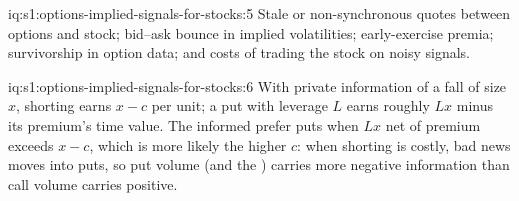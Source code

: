 \begin{solution}{iq:s1:options-implied-signals-for-stocks:5}
Stale or non-synchronous quotes between options and stock; bid--ask bounce in implied volatilities; early-exercise premia; survivorship in option data; and
costs of trading the stock on noisy signals.
\end{solution}

\begin{solution}{iq:s1:options-implied-signals-for-stocks:6}
With private information of a fall of size $x$, shorting earns $x - c$ per unit; a put with leverage $L$ earns roughly $Lx$ minus its premium's time value. The
informed prefer puts when $Lx$ net of premium exceeds $x - c$, which is more likely the higher $c$: when shorting is costly, bad news moves into puts, so put
volume (and the ) carries more negative information than call volume carries positive.
\end{solution}
